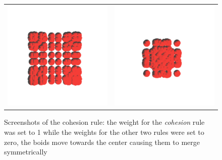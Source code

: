 \begin{figure}[htbp]
\begin{center}
\begin{tabular}{cc}
\includegraphics[scale= 0.5]{figures/coh3.pdf} &
\includegraphics[scale= 0.5]{figures/coh4.pdf}
\end{tabular}
\end{center}
\caption{Screenshots of the cohesion rule: the weight for the \textit{cohesion} rule was set to 1 while the weights for the other two rules were set to zero, the boids move towards the center causing them to merge symmetrically}
\label{cohRule}
\end{figure}

